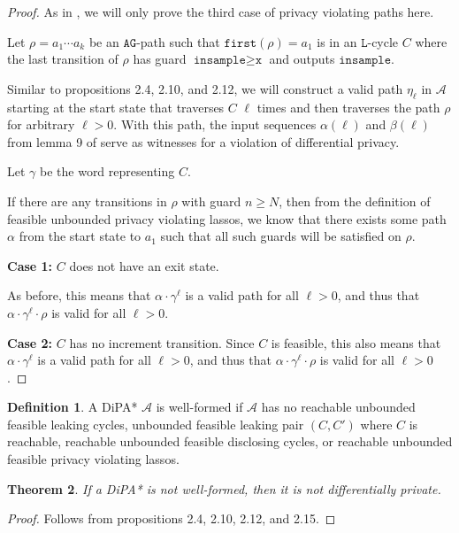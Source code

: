 \documentclass[12pt]{article}
\newcommand{\gguard}{\texttt{insample}\geq \texttt{x}}
\newtheorem{thm}{Theorem}[section]
\theoremstyle{definition}
\newtheorem{defn}[thm]{Definition}
\begin{document}
\begin{proof}
	As in \cite{chadhaLinearTimeDecidability2021}, we will only prove the third case of privacy violating paths here.

	Let $\rho = a_1\cdots a_k$ be an $\texttt{AG}$-path such that $\texttt{first}(\rho)=a_1 $ is in an $\texttt{L}$-cycle $C$ where the last transition of $\rho$ has guard $\gguard$ and outputs $\texttt{insample}$.

	Similar to propositions 2.4, 2.10, and 2.12, we will construct a valid path $\eta_\ell$ in $\mathcal{A}$ starting at the start state that traverses $C$ $\ell$ times and then traverses the path $\rho$ for arbitrary $\ell >0$. With this path, the input sequences $\alpha(\ell)$ and $\beta(\ell)$ from lemma 9 of \cite{chadhaLinearTimeDecidability2021} serve as witnesses for a violation of differential privacy.

	Let $\gamma$ be the word representing $C$. 

	If there are any transitions in $\rho$ with guard $n \geq N$, then from the definition of feasible unbounded privacy violating lassos, we know that there exists some path $\alpha$ from the start state to $a_1$ such that all such guards will be satisfied on $\rho$. 

	\textbf{Case 1:} $C$ does not have an exit state.

	As before, this means that $\alpha\cdot \gamma^\ell$ is a valid path for all $\ell > 0$, and thus that $\alpha \cdot \gamma^\ell \cdot \rho$ is valid for all $\ell > 0$.

	\textbf{Case 2:} $C$ has no increment transition.
	Since $C$ is feasible, this also means that $\alpha\cdot \gamma^\ell$ is a valid path for all $\ell > 0$, and thus that $\alpha \cdot \gamma^\ell \cdot \rho$ is valid for all $\ell > 0$.

\end{proof}


\begin{defn} 
	A DiPA* $\mathcal{A}$ is well-formed if $\mathcal{A}$ has no reachable unbounded feasible leaking cycles, unbounded feasible leaking pair $(C, C')$ where $C$ is reachable, reachable unbounded feasible disclosing cycles, or reachable unbounded feasible privacy violating lassos.
\end{defn}

\begin{thm} 
	If a DiPA* is not well-formed, then it is not differentially private.
\end{thm}
\begin{proof}
	Follows from propositions 2.4, 2.10, 2.12, and 2.15.
\end{proof}
\end{document}

